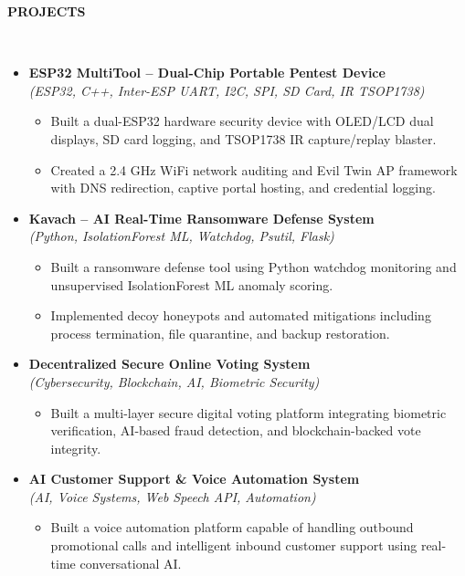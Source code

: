\documentclass[a4paper,10pt]{article}
\newcommand{\isep}{-2 pt}
\newcommand{\lsep}{-0.5cm}
\newcommand{\resheading}[1]{{\small \colorbox{mygrey}{\begin{minipage}{6.62in}{\textbf{#1 \vphantom{p\^{E}}}}\end{minipage}}}}
\begin{document}
\resheading{\textbf{PROJECTS} }\\[\lsep]
\begin{itemize}
\item \textbf{ESP32 MultiTool -- Dual-Chip Portable Pentest Device} \\
 \emph{(ESP32, C++, Inter-ESP UART, I2C, SPI, SD Card, IR TSOP1738)} \\[-0.6cm]
	\begin{itemize}\itemsep \isep
	\item Built a dual-ESP32 hardware security device with OLED/LCD dual displays, SD card logging, and TSOP1738 IR capture/replay blaster.
	\item Created a 2.4 GHz WiFi network auditing and Evil Twin AP framework with DNS redirection, captive portal hosting, and credential logging.
	\end{itemize}

\item \textbf{Kavach -- AI Real-Time Ransomware Defense System} \\
 \emph{(Python, IsolationForest ML, Watchdog, Psutil, Flask)} \\[-0.6cm]
	\begin{itemize}\itemsep \isep
	\item Built a ransomware defense tool using Python watchdog monitoring and unsupervised IsolationForest ML anomaly scoring.
	\item Implemented decoy honeypots and automated mitigations including process termination, file quarantine, and backup restoration.
	\end{itemize}

\item \textbf{Decentralized Secure Online Voting System} \\
 \emph{(Cybersecurity, Blockchain, AI, Biometric Security)} \\[-0.6cm]
	\begin{itemize}\itemsep \isep
	\item Built a multi-layer secure digital voting platform integrating biometric verification, AI-based fraud detection, and blockchain-backed vote integrity.
	\end{itemize}

\item \textbf{AI Customer Support \& Voice Automation System} \\
 \emph{(AI, Voice Systems, Web Speech API, Automation)} \\[-0.6cm]
	\begin{itemize}\itemsep \isep
	\item Built a voice automation platform capable of handling outbound promotional calls and intelligent inbound customer support using real-time conversational AI.
	\end{itemize}


\end{itemize}
\end{document}
